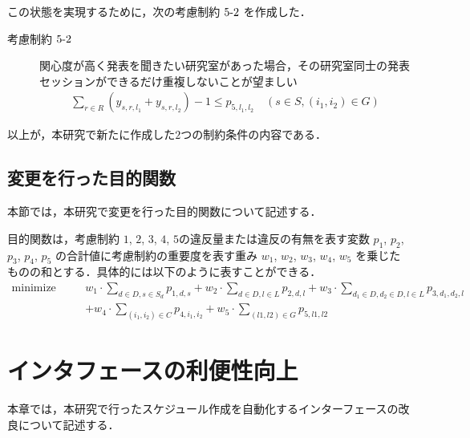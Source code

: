 \documentclass[a4paper,12pt,fleqn]{jarticle}
\begin{document}
この状態を実現するために，次の考慮制約 $5\mathchar`-2$ を作成した．
 \begin{description}
 \item[考慮制約 $5\mathchar`-2$] 関心度が高く発表を聞きたい研究室があった場合，その研究室同士の発表セッションができるだけ重複しないことが望ましい
   \begin{eqnarray}
    \sum_{r \in R} (y_{s,r,l_1} + y_{s,r,l_2}) - 1 \leq p_{5,l_1,l_2} \quad (s \in S,(i_1,i_2) \in G) \label{eq:p6}
  \end{eqnarray}
  \end{description}
以上が，本研究で新たに作成した$2$つの制約条件の内容である．

\subsection{変更を行った目的関数}\label{sec:mokuteki}
本節では，本研究で変更を行った目的関数について記述する．

目的関数は，考慮制約 $1$, $2$, $3$, $4$, $5$の違反量または違反の有無を表す変数 $p_1$, $p_2$, $p_3$, $p_4$, $p_5$ の合計値に考慮制約の重要度を表す重み $w_1$, $w_2$, $w_3$, $w_4$, $w_5$ を乗じたものの和とする．具体的には以下のように表すことができる．
\begin{eqnarray}
  \text{minimize} &\quad& w_1 \cdot \sum_{d \in D, s \in S_d} p_{1,d,s} + w_2 \cdot \sum_{d \in D, l \in L} p_{2,d,l} + w_3 \cdot \sum_{d_1 \in D, d_2 \in D, l \in L} p_{3,d_1,d_2,l} \nonumber \\
  && + w_4 \cdot \sum_{(i_1, i_2) \in C} p_{4,i_1,i_2} + w_5 \cdot \sum_{(l1,l2) \in G} p_{5,l1,l2}
\end{eqnarray}

\newpage
\section{インタフェースの利便性向上}\label{sec:inter}
本章では，本研究で行ったスケジュール作成を自動化するインターフェースの改良について記述する．
\end{document}
